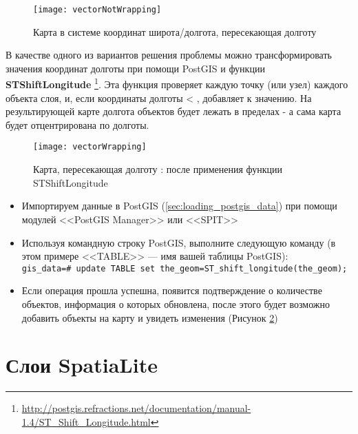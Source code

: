 \begin{figure}[ht]
   \centering
   \texttt{[image: vectorNotWrapping]}
      \caption{Карта в системе координат широта/долгота, пересекающая долготу  \nixcaption}
   \label{fig:vector_not_wrapping}
\end{figure}

В качестве одного из вариантов решения проблемы можно трансформировать значения координат долготы
при помощи PostGIS и функции
\textbf{ST\textunderscore Shift\textunderscore Longitude}
\footnote{\url{http://postgis.refractions.net/documentation/manual-1.4/ST\_Shift\_Longitude.html}}.
Эта функция проверяет каждую точку (или узел) каждого объекта слоя,
и, если координаты долготы < , добавляет
 к значению. На результирующей карте долгота объектов будет лежать в пределах  - 
а сама карта будет отцентрирована по  долготы.

\begin{figure}[ht]
   \centering
   \texttt{[image: vectorWrapping]}
   \caption{Карта, пересекающая долготу : после применения функции ST\textunderscore Shift\textunderscore Longitude \nixcaption}
\label{fig:vector_wrapping}
\end{figure}


\begin{itemize}[label=--]
\item Импортируем данные в PostGIS (\ref{sec:loading_postgis_data}) при помощи
модулей <<PostGIS Manager>> или <<SPIT>>
\item Используя командную строку PostGIS, выполните следующую команду
(в этом примере <<TABLE>> --- имя вашей таблицы PostGIS): \\
\texttt{gis\_data=\# update TABLE set the\_geom=ST\_shift\_longitude(the\_geom);}
\item Если операция прошла успешна, появится подтверждение о количестве
объектов, информация о которых обновлена, после этого будет возможно добавить объекты на карту
и увидеть изменения (Рисунок \ref{fig:vector_wrapping})
\end{itemize}

\section{Слои SpatiaLite}
\label{label_spatialite}

